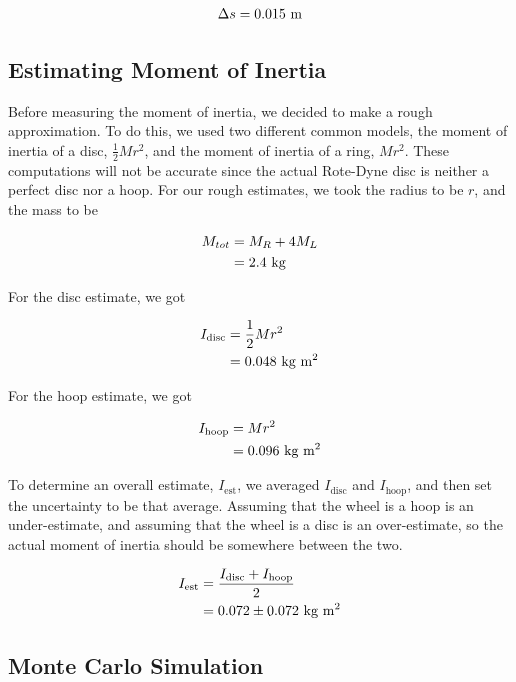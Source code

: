 \documentclass[coverpage]{article}
\newcommand{\iUnit}{\text{kg $\text{m}^2$}}
\begin{document}
	\begin{align}
		\Delta{s}=0.015\ \text{m} \notag
	\end{align}

	\subsection{Estimating Moment of Inertia} \label{sect:estimating-moment-of-inertia}

	Before measuring the moment of inertia, we decided to make a rough approximation. To do this, we used two different common models, the moment of inertia of a disc, $\frac{1}{2}Mr^2$, and the moment of inertia of a ring, $Mr^2$. These computations will not be accurate since the actual Rote-Dyne disc is neither a perfect disc nor a hoop. For our rough estimates, we took the radius to be $r$, and the mass to be
	
	\begin{align}
		M_{tot}&=M_R + 4 M_L \notag \\
		&= 2.4\ \text{kg}
	\end{align}
	
	For the disc estimate, we got
	
	\begin{align}
		I_{\text{disc}}&=\frac{1}{2}Mr^2 \notag \\
		&= 0.048\ \iUnit
	\end{align}
	
	For the hoop estimate, we got
	
	\begin{align}
		I_{\text{hoop}}&= Mr^2 \notag \\
		&= 0.096\ \iUnit
	\end{align}

	To determine an overall estimate, $I_{\text{est}}$, we averaged $I_{\text{disc}}$ and $I_{\text{hoop}}$, and then set the uncertainty to be that average. Assuming that the wheel is a hoop is an under-estimate, and assuming that the wheel is a disc is an over-estimate, so the actual moment of inertia should be somewhere between the two.
	
	\begin{align}
		I_{\text{est}}&=\frac{I_{\text{disc}} + I_{\text{hoop}}}{2} \notag \\
		&= 0.072 \pm 0.072\ \iUnit \label{eq:def-i-est}
	\end{align}

	\subsection{Monte Carlo Simulation}
	
\end{document}
